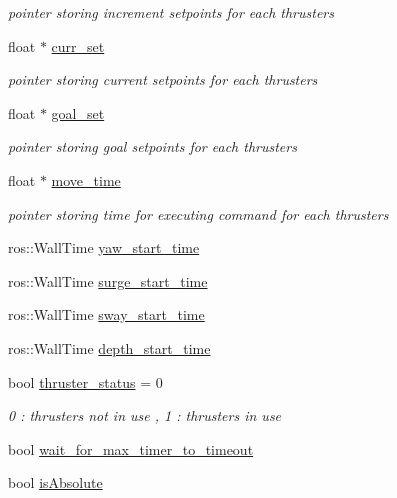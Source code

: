 \begin{DoxyCompactItemize}
\begin{DoxyCompactList}\small\item\em pointer storing increment setpoints for each thrusters \end{DoxyCompactList}\item 
float $\ast$ \hyperlink{classControl_a42067224edcba565aa68d4bf087e45e8}{curr\+\_\+set}
\begin{DoxyCompactList}\small\item\em pointer storing current setpoints for each thrusters \end{DoxyCompactList}\item 
float $\ast$ \hyperlink{classControl_ac7a1ee49d8d049924d680f393b43842b}{goal\+\_\+set}
\begin{DoxyCompactList}\small\item\em pointer storing goal setpoints for each thrusters \end{DoxyCompactList}\item 
float $\ast$ \hyperlink{classControl_a4274ca145ba190a4d246b7b28d2553cc}{move\+\_\+time}
\begin{DoxyCompactList}\small\item\em pointer storing time for executing command for each thrusters \end{DoxyCompactList}\item 
ros\+::\+Wall\+Time \hyperlink{classControl_a6934796a534d791ffea03448b383957b}{yaw\+\_\+start\+\_\+time}
\item 
ros\+::\+Wall\+Time \hyperlink{classControl_ac4d0e192a272517b5921915e65869b7b}{surge\+\_\+start\+\_\+time}
\item 
ros\+::\+Wall\+Time \hyperlink{classControl_a1d05716c729b56329776ab242498d2dd}{sway\+\_\+start\+\_\+time}
\item 
ros\+::\+Wall\+Time \hyperlink{classControl_af1c6dd9d0fe3364d6104754e251de910}{depth\+\_\+start\+\_\+time}
\item 
bool \hyperlink{classControl_a3de70e43f3432be0d75cff773f325421}{thruster\+\_\+status} = 0
\begin{DoxyCompactList}\small\item\em 0 \+: thrusters not in use , 1 \+: thrusters in use \end{DoxyCompactList}\item 
bool \hyperlink{classControl_a91aff903721b3e11bc7e4ea1d621dfbf}{wait\+\_\+for\+\_\+max\+\_\+timer\+\_\+to\+\_\+timeout}
\item 
bool \hyperlink{classControl_aa01779cbcdef554d2e6c77e05d7b521a}{is\+Absolute}

\end{DoxyCompactItemize}
